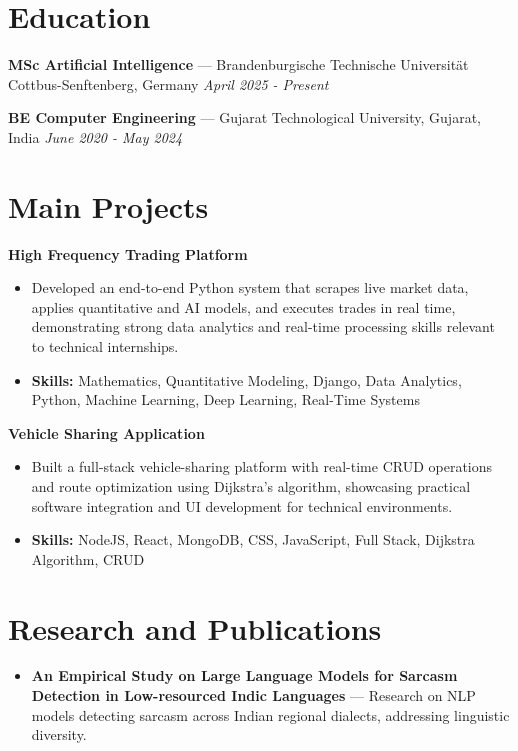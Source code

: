 \documentclass[a4paper,10pt]{article}
\begin{document}
\section*{Education}
\textbf{MSc Artificial Intelligence} — Brandenburgische Technische Universität Cottbus-Senftenberg, Germany \hfill \textit{April 2025 - Present}\par
\vspace{1.5pt}
\textbf{BE Computer Engineering} — Gujarat Technological University, Gujarat, India \hfill \textit{June 2020 - May 2024}\par

\section*{Main Projects}
\textbf{High Frequency Trading Platform}\par
\vspace{1pt}
\begin{itemize}
  \item Developed an end-to-end Python system that scrapes live market data, applies quantitative and AI models, and executes trades in real time, demonstrating strong data analytics and real-time processing skills relevant to technical internships.
  \item \textbf{Skills:} Mathematics, Quantitative Modeling, Django, Data Analytics, Python, Machine Learning, Deep Learning, Real-Time Systems
\end{itemize}
\vspace{3pt}
\textbf{Vehicle Sharing Application}\par
\vspace{1pt}
\begin{itemize}
  \item Built a full-stack vehicle-sharing platform with real-time CRUD operations and route optimization using Dijkstra's algorithm, showcasing practical software integration and UI development for technical environments.
  \item \textbf{Skills:} NodeJS, React, MongoDB, CSS, JavaScript, Full Stack, Dijkstra Algorithm, CRUD
\end{itemize}

\section*{Research and Publications}
\begin{itemize}
\item \textbf{An Empirical Study on Large Language Models for Sarcasm Detection in Low-resourced Indic Languages} — Research on NLP models detecting sarcasm across Indian regional dialects, addressing linguistic diversity.
\end{itemize}
\end{document}
